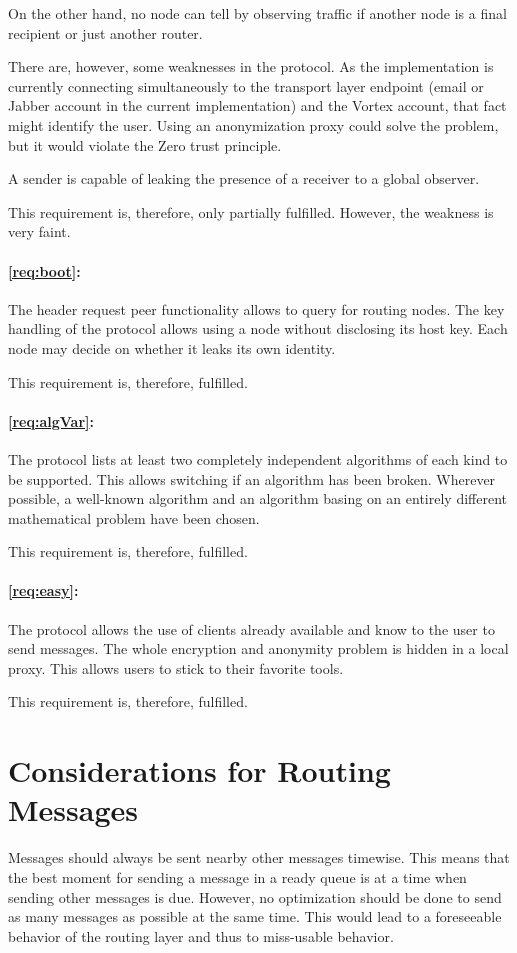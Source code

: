 On the other hand, no node can tell by observing traffic if another node is a final recipient or just another router.

There are, however, some weaknesses in the protocol. As the implementation is currently connecting simultaneously to the transport layer endpoint (email or Jabber account in the current implementation) and the Vortex account, that fact might identify the user. Using an anonymization proxy could solve the problem, but it would violate the Zero trust principle.

A sender is capable of leaking the presence of a receiver to a global observer.

This requirement is, therefore, only partially fulfilled. However, the weakness is very faint.

\paragraph*{\ref{req:boot}:} The header request peer functionality allows to query for routing nodes. The key handling of the protocol allows using a node without disclosing its host key. Each node may decide on whether it leaks its own identity.

This requirement is, therefore, fulfilled.

\paragraph*{\ref{req:algVar}:} The protocol lists at least two completely independent algorithms of each kind to be supported. This allows switching if an algorithm has been broken. Wherever possible, a well-known algorithm and an algorithm basing on an entirely different mathematical problem have been chosen.

This requirement is, therefore, fulfilled.

\paragraph*{\ref{req:easy}:} The protocol allows the use of clients already available and know to the user to send messages. The whole encryption and anonymity problem is hidden in a local proxy. This allows users to stick to their favorite tools.

This requirement is,  therefore, fulfilled.

\section{Considerations for Routing Messages}
Messages should always be sent nearby other messages timewise. This means that the best moment for sending a message in a ready queue is at a time when sending other messages is due. However, no optimization should be done to send as many messages as possible at the same time. This would lead to a foreseeable behavior of the routing layer and thus to miss-usable behavior.

